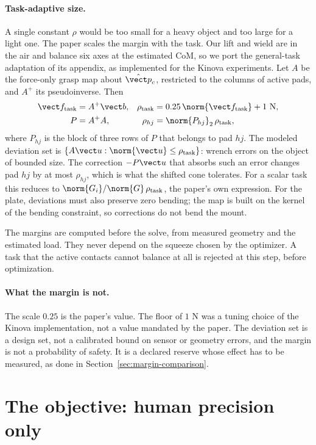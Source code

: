 \paragraph{Task-adaptive size.}
A single constant $\rho$ would be too small for a heavy object and too large for a light one. The paper scales the margin with the task. Our lift and wield are in the air and balance six axes at the estimated CoM, so we port the general-task adaptation of its appendix, as implemented for the Kinova experiments. Let $A$ be the force-only grasp map about $\hat{\vect p}_c$, restricted to the columns of active pads, and $A^+$ its pseudoinverse. Then
\begin{align}
\vect f_{\mathrm{task}}&=A^+\vect b, &
\rho_{\mathrm{task}}&=0.25\,\norm{\vect f_{\mathrm{task}}}+1\ \mathrm{N},\nonumber\\
P&=A^+A, &
\rho_{hj}&=\norm{P_{hj}}_2\,\rho_{\mathrm{task}},
\label{eq:task-margin}
\end{align}
where $P_{hj}$ is the block of three rows of $P$ that belongs to pad $hj$. The modeled deviation set is $\{A\vect u:\norm{\vect u}\leq\rho_{\mathrm{task}}\}$: wrench errors on the object of bounded size. The correction $-P\vect u$ that absorbs such an error changes pad $hj$ by at most $\rho_{hj}$, which is what the shifted cone tolerates. For a scalar task this reduces to $\norm{G_i}/\norm{G}\,\rho_{\mathrm{task}}$, the paper's own expression. For the plate, deviations must also preserve zero bending; the map is built on the kernel of the bending constraint, so corrections do not bend the mount.

The margins are computed before the solve, from measured geometry and the estimated load. They never depend on the squeeze chosen by the optimizer. A task that the active contacts cannot balance at all is rejected at this step, before optimization.

\paragraph{What the margin is not.}
The scale $0.25$ is the paper's value. The floor of $1$ N was a tuning choice of the Kinova implementation, not a value mandated by the paper. The deviation set is a design set, not a calibrated bound on sensor or geometry errors, and the margin is not a probability of safety. It is a declared reserve whose effect has to be measured, as done in Section~\ref{sec:margin-comparison}.

\section{The objective: human precision only}

